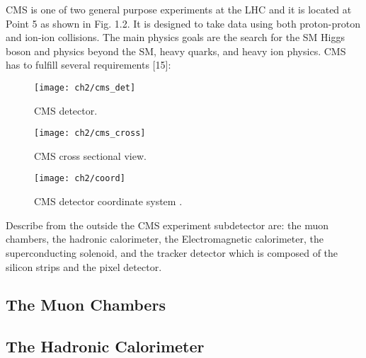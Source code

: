 CMS is one of two general purpose experiments at the LHC and it is located at Point 5 as
shown in Fig. 1.2. It is designed to take data using both proton-proton and ion-ion collisions.
The main physics goals are the search for the SM Higgs boson and physics beyond the SM,
heavy quarks, and heavy ion physics.
CMS has to fulfill several requirements [15]:




\begin{figure}[!h]
	\centering
	\texttt{[image: ch2/cms\_det]}
	\caption[CMS detector]{CMS detector.}
	\label{cms_det}
\end{figure}

\begin{figure}[!h]
	\centering
	\texttt{[image: ch2/cms\_cross]}
	\caption[CMS cross sectional view]{CMS cross sectional view.}
	\label{cmscross}
\end{figure}

\begin{figure}[h!]
	\centering
	\texttt{[image: ch2/coord]}
	\caption[CMS detector coordinate system]{CMS detector coordinate system \cite{and_the}.}
	\label{fig:coord}
\end{figure}

Describe from the outside the CMS experiment subdetector are: the muon chambers, the hadronic calorimeter, the Electromagnetic calorimeter, the superconducting solenoid, and the tracker detector which is composed of the silicon strips and the pixel detector.

\subsection{The Muon Chambers}

\subsection{The Hadronic Calorimeter}

